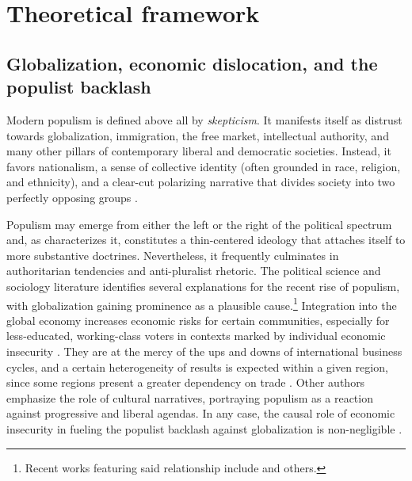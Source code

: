 \documentclass[
	11pt,				%
	oneside,			%
	a4paper,			%
	english,			%
	english				%
	]{abntex2ppgsi}
\theoremstyle{plain}
\theoremstyle{remark}
\theoremstyle{plain}%
\theoremstyle{remark}%
\begin{document}
\chapter{Theoretical framework}
\label{ch:theoretical-framework}

\section{Globalization, economic dislocation, and the populist backlash}

Modern populism is defined above all by \emph{skepticism}. It manifests itself as distrust towards globalization, immigration, the free market, intellectual authority, and many other pillars of contemporary liberal and democratic societies. Instead, it favors nationalism, a sense of collective identity (often grounded in race, religion, and ethnicity), and a clear-cut polarizing narrative that divides society into two perfectly opposing groups \cite{Muller}. 


Populism may emerge from either the left or the right of the political spectrum and, as  characterizes it, constitutes a thin-centered ideology that attaches itself to more substantive doctrines. Nevertheless, it frequently culminates in authoritarian tendencies and anti-pluralist rhetoric. The political science and sociology literature identifies several explanations for the recent rise of populism, with globalization gaining prominence as a plausible cause.\footnote{Recent works featuring said relationship include  and others.} Integration into the global economy increases economic risks for certain communities, especially for less-educated, working-class voters in contexts marked by individual economic insecurity \cite{mughan}. They are at the mercy of the ups and downs of international business cycles, and a certain heterogeneity of results is expected within a given region, since some regions present a greater dependency on trade \cite{rodrikQA}. Other authors emphasize the role of cultural narratives, portraying populism as a reaction against progressive and liberal agendas. In any case, the causal role of economic insecurity in fueling the populist backlash against globalization is non-negligible \cite{Scheiring}. 
\end{document}
